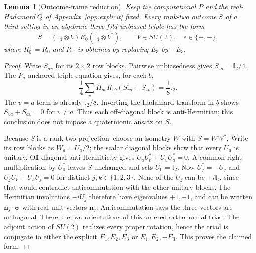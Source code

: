 \documentclass[11pt]{article}
\newtheorem{lemma}[theorem]{Lemma}
\newcommand{\id}{\mathbb I}
\begin{document}
\begin{lemma}[Outcome-frame reduction]\label{lem:outcomeframe}
Keep the computational $P$ and the real-Hadamard $Q$ of Appendix~\ref{app:explicit} fixed.
Every rank-two outcome $S$ of a third setting in an algebraic three-fold
unbiased triple has the form
\[
 S=(\id_4\otimes V)R_0^{\epsilon}(\id_4\otimes V^*),
 \qquad V\in SU(2),\quad \epsilon\in\{+,-\},
\]
where $R_0^+=R_0$ and $R_0^-$ is obtained by replacing $E_3$ by $-E_3$.
\end{lemma}
\begin{proof}
Write $S_{av}$ for its $2\times2$ row blocks. Pairwise unbiasedness
gives $S_{aa}=\id_2/4$. The $P_a$-anchored triple equation gives, for
each $b$,
\[
 \frac14\sum_v H_{ab}H_{vb}(S_{va}+S_{av})=\frac18\id_2.
\]
The $v=a$ term is already $\id_2/8$. Inverting the Hadamard transform
in $b$ shows $S_{va}+S_{av}=0$ for $v\ne a$. Thus each off-diagonal
block is anti-Hermitian; this conclusion does not impose a quaternionic
ansatz on $S$.

Because $S$ is a rank-two projection, choose an isometry $W$ with
$S=WW^*$. Write its row blocks as $W_a=U_a/2$; the scalar diagonal
blocks show that every $U_a$ is unitary. Off-diagonal anti-Hermiticity
gives $U_aU_v^*+U_vU_a^*=0$. A common right multiplication by $U_0^*$
leaves $S$ unchanged and sets $U_0=\id_2$. Now $U_j^*=-U_j$ and
$U_jU_k+U_kU_j=0$ for distinct $j,k\in\{1,2,3\}$.
None of the $U_j$ can be $\pm i\id_2$, since that would contradict
anticommutation with the other unitary blocks. The Hermitian involutions
$-iU_j$ therefore have eigenvalues $+1,-1$, and can be written
$\boldsymbol n_j\cdot\boldsymbol\sigma$ with real unit vectors
$\boldsymbol n_j$. Anticommutation says the three vectors are orthogonal.
There are two orientations of this ordered orthonormal triad. The
adjoint action of $SU(2)$ realizes every proper rotation, hence the triad
is conjugate to either the explicit $E_1,E_2,E_3$ or
$E_1,E_2,-E_3$. This proves the claimed form.
\end{proof}
\end{document}
